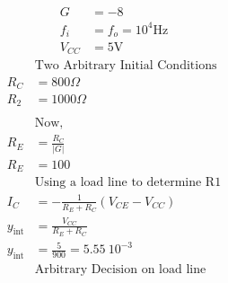 \documentclass{article}
\begin{document}
\begin{align*}
G & =-8\\
f_{i} & =f_{o} =10^{4}\text{Hz}\\
V_{CC} & =5\text{V}
\end{align*}
\begin{align*}
 & \text{Two Arbitrary Initial Conditions}\\
R_{C} & =800\Omega \\
R_{2} & =1000\Omega \\
 & \\
 & \text{Now,}\\
R_{E} & =\frac{R_{C}}{| G| }\\
R_{E} & =100\\
 & \text{Using a load line 
to determine R1}\\
I_{C} & =-\frac{1}{R_{E} +R_{C}}( V_{CE} -V_{CC})\\
y_{\text{int}} & =\frac{V_{CC}}{R_{E} +R_{C}}\\
y_{\text{int}} & =\frac{5}{900} =5.55\ 10^{-3}\\
 & \text{Arbitrary Decision
on load line}
\end{align*}
\end{document}
